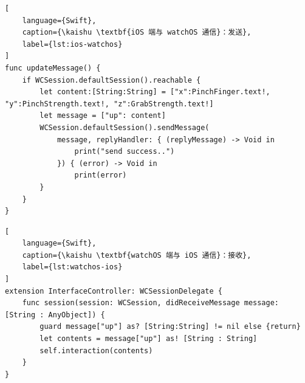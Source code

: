 \begin{lstlisting}[
    language={Swift},
    caption={\kaishu \textbf{iOS 端与 watchOS 通信}：发送},
    label={lst:ios-watchos}
]
func updateMessage() {
    if WCSession.defaultSession().reachable {
        let content:[String:String] = ["x":PinchFinger.text!, "y":PinchStrength.text!, "z":GrabStrength.text!]
        let message = ["up": content]
        WCSession.defaultSession().sendMessage(
            message, replyHandler: { (replyMessage) -> Void in
                print("send success..")
            }) { (error) -> Void in
                print(error)
        }
    }
}
\end{lstlisting}
\begin{lstlisting}[
    language={Swift},
    caption={\kaishu \textbf{watchOS 端与 iOS 通信}：接收},
    label={lst:watchos-ios}
]
extension InterfaceController: WCSessionDelegate {
    func session(session: WCSession, didReceiveMessage message: [String : AnyObject]) {
        guard message["up"] as? [String:String] != nil else {return}
        let contents = message["up"] as! [String : String]
        self.interaction(contents)
    }
}
\end{lstlisting}

\cleardoublepage
